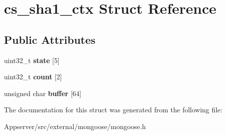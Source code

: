 \hypertarget{structcs__sha1__ctx}{}\section{cs\+\_\+sha1\+\_\+ctx Struct Reference}
\label{structcs__sha1__ctx}
\subsection*{Public Attributes}
\begin{DoxyCompactItemize}
\item 
uint32\+\_\+t {\bfseries state} \mbox{[}5\mbox{]}\hypertarget{structcs__sha1__ctx_aaec67b16b157c16a771df82ec41220b0}{}\label{structcs__sha1__ctx_aaec67b16b157c16a771df82ec41220b0}

\item 
uint32\+\_\+t {\bfseries count} \mbox{[}2\mbox{]}\hypertarget{structcs__sha1__ctx_af6258c6cb812c334f1a287e2d6b9ea09}{}\label{structcs__sha1__ctx_af6258c6cb812c334f1a287e2d6b9ea09}

\item 
unsigned char {\bfseries buffer} \mbox{[}64\mbox{]}\hypertarget{structcs__sha1__ctx_ac7c9295501f0e13de5b0db4305a2719b}{}\label{structcs__sha1__ctx_ac7c9295501f0e13de5b0db4305a2719b}

\end{DoxyCompactItemize}


The documentation for this struct was generated from the following file\+:\begin{DoxyCompactItemize}
\item 
Appserver/src/external/mongoose/mongoose.\+h\end{DoxyCompactItemize}
